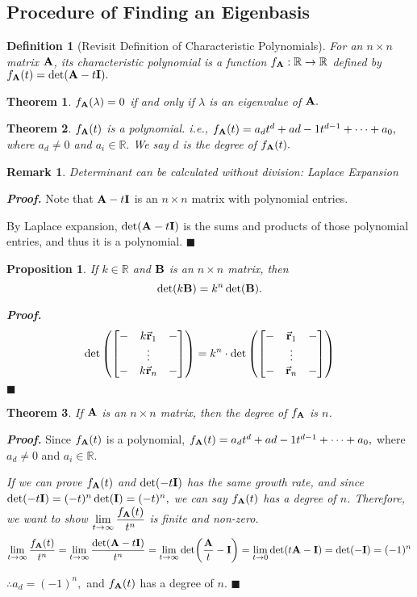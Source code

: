 \documentclass[12pt, a4paper]{article}
\newtheorem{thm}{Theorem}[subsection]
\newtheorem{df}{Definition}[subsection]
\newtheorem{prop}{Proposition}[section]
\newtheorem*{rmk}{\indent Remark}
\newenvironment*{prf}{\par\indent\textbf{\textit{Proof. }}}{\hfill $\blacksquare$\par}
\def\R{{\mathbb{R}}}
\def\vecr{\va{r}}
\def\matrixA{\vb{A}}
\def\matrixB{\vb{B}}
\def\matrixI{\vb{I}}
\def\dsst{\displaystyle}
\begin{document}
\subsection{Procedure of Finding an Eigenbasis}
\begin{df}[Revisit Definition of Characteristic Polynomials]
	For an $n\times n$ matrix $\matrixA$, its characteristic polynomial is a function $f_{\matrixA}:\R\to\R$ defined by $f_{\matrixA}(t)=\det(\matrixA-t\matrixI).$
\end{df}
\begin{thm}
	$f_{\matrixA}(\lambda)=0$ if and only if $\lambda$ is an eigenvalue of $\matrixA.$
\end{thm}
\begin{thm}
	$f_{\matrixA}(t)$ is a polynomial. i.e., $f_{\matrixA}(t)=a_dt^d+a{d-1}t^{d-1}+\cdots+a_0,$ where $a_d\neq0$ and $a_i\in\R.$ We say $d$ is the degree of $f_{\matrixA}(t).$
\end{thm}
\begin{rmk}
	Determinant can be calculated without division: Laplace Expansion
\end{rmk}
\begin{prf}
	Note that $\matrixA-t\matrixI$ is an $n\times n$ matrix with polynomial entries. \par By Laplace expansion, $\det(\matrixA-t\matrixI)$ is the sums and products of those polynomial entries, and thus it is a polynomial. 
\end{prf}
\begin{prop}
	If $k\in\R$ and $\matrixB$ is an $n\times n$ matrix, then \[\det(k\matrixB)=k^n\det(\matrixB).\]	
\end{prop}
\begin{prf}
	\[\det\qty(\mqty[-&k\vecr_1&-\\&\vdots&\\-&k\vecr_n&-])=k^n\cdot\det\qty(\mqty[-&\vecr_1&-\\&\vdots&\\-&\vecr_n&-])\]	
\end{prf}
\begin{thm}
	If $\matrixA$ is an $n\times n$ matrix, then the degree of $f_{\matrixA}$ is $n$.
\end{thm}
\begin{prf}
	Since $f_{\matrixA}(t)$ is a polynomial, $f_{\matrixA}(t)=a_dt^d+a{d-1}t^{d-1}+\cdots+a_0,$ where $a_d\neq0$ and $a_i\in\R.$\par \textit{If we can prove $f_{\matrixA}(t)$ and $\det(-t\matrixI)$ has the same growth rate, and since $\det(-t\matrixI)=(-t)^n\det(\matrixI)=(-t)^n,$ we can say $f_{\matrixA}(t)$ has a degree of $n$. Therefore, we want to show $\dsst\lim_{t\to\infty}\dfrac{f_{\matrixA}(t)}{t^n}$ is finite and non-zero.}	\[\lim_{t\to\infty}\dfrac{f_{\matrixA}(t)}{t^n}=\lim_{t\to\infty}\dfrac{\det(\matrixA-t\matrixI)}{t^n}=\lim_{t\to\infty}\det(\dfrac{\matrixA}{t}-\matrixI)=\lim_{t\to0}\det(t\matrixA-\matrixI)=\det(-\matrixI)=(-1)^n\]\par $\therefore a_d=(-1)^n,$ and $f_{\matrixA}(t)$ has a degree of $n$.
\end{prf}
\end{document}
